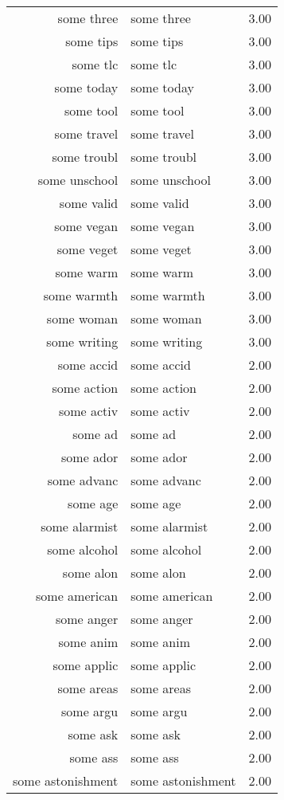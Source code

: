 \begin{table}[ht]
\begin{tabular}{rlr}
  some three & some three & 3.00 \\ 
  some tips & some tips & 3.00 \\ 
  some tlc & some tlc & 3.00 \\ 
  some today & some today & 3.00 \\ 
  some tool & some tool & 3.00 \\ 
  some travel & some travel & 3.00 \\ 
  some troubl & some troubl & 3.00 \\ 
  some unschool & some unschool & 3.00 \\ 
  some valid & some valid & 3.00 \\ 
  some vegan & some vegan & 3.00 \\ 
  some veget & some veget & 3.00 \\ 
  some warm & some warm & 3.00 \\ 
  some warmth & some warmth & 3.00 \\ 
  some woman & some woman & 3.00 \\ 
  some writing & some writing & 3.00 \\ 
  some accid & some accid & 2.00 \\ 
  some action & some action & 2.00 \\ 
  some activ & some activ & 2.00 \\ 
  some ad & some ad & 2.00 \\ 
  some ador & some ador & 2.00 \\ 
  some advanc & some advanc & 2.00 \\ 
  some age & some age & 2.00 \\ 
  some alarmist & some alarmist & 2.00 \\ 
  some alcohol & some alcohol & 2.00 \\ 
  some alon & some alon & 2.00 \\ 
  some american & some american & 2.00 \\ 
  some anger & some anger & 2.00 \\ 
  some anim & some anim & 2.00 \\ 
  some applic & some applic & 2.00 \\ 
  some areas & some areas & 2.00 \\ 
  some argu & some argu & 2.00 \\ 
  some ask & some ask & 2.00 \\ 
  some ass & some ass & 2.00 \\ 
  some astonishment & some astonishment & 2.00 \\ 

\end{tabular}
\end{table}
